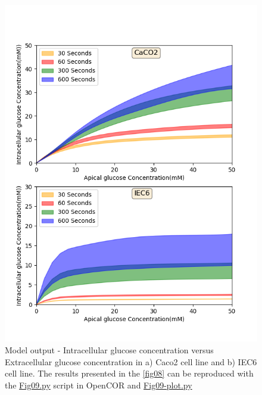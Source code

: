 \documentclass[fleqn,10pt]{physiome}
\begin{document}
\begin{figure}[ht]
	\begin{center}
		\includegraphics[scale=0.7]{fig09.png}
		\caption{\label{fig09} Model output - Intracellular glucose concentration versus Extracellular glucose concentration in a) Caco2 cell line and b) IEC6 cell line. The results presented in the \autoref{fig08} can be reproduced with the \href{https://models.physiomeproject.org/workspace/572/file/c052b0c460280139dad150937fbee4fa6a026505/SEDML_files/Fig09.py}{Fig09.py} script in OpenCOR and \href{https://models.physiomeproject.org/workspace/572/file/c052b0c460280139dad150937fbee4fa6a026505/SEDML_files/Fig09_plot.py}{Fig09-plot.py}}
	\end{center}
\end{figure}\newpage



\end{document}
